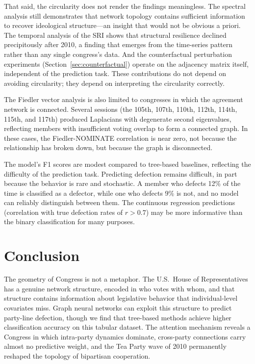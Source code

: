 \documentclass[11pt]{article}
\begin{document}
That said, the circularity does not render the findings meaningless. The spectral analysis still demonstrates that network topology contains sufficient information to recover ideological structure---an insight that would not be obvious a priori. The temporal analysis of the SRI shows that structural resilience declined precipitously after 2010, a finding that emerges from the time-series pattern rather than any single congress's data. And the counterfactual perturbation experiments (Section~\ref{sec:counterfactual}) operate on the adjacency matrix itself, independent of the prediction task. These contributions do not depend on avoiding circularity; they depend on interpreting the circularity correctly.

The Fiedler vector analysis is also limited to congresses in which the agreement network is connected. Several sessions (the 105th, 107th, 110th, 112th, 114th, 115th, and 117th) produced Laplacians with degenerate second eigenvalues, reflecting members with insufficient voting overlap to form a connected graph. In these cases, the Fiedler-NOMINATE correlation is near zero, not because the relationship has broken down, but because the graph is disconnected.

The model's F1 scores are modest compared to tree-based baselines, reflecting the difficulty of the prediction task. Predicting defection remains difficult, in part because the behavior is rare and stochastic. A member who defects 12\% of the time is classified as a defector, while one who defects 9\% is not, and no model can reliably distinguish between them. The continuous regression predictions (correlation with true defection rates of $r > 0.7$) may be more informative than the binary classification for many purposes.

\section{Conclusion}

The geometry of Congress is not a metaphor. The U.S.\ House of Representatives has a genuine network structure, encoded in who votes with whom, and that structure contains information about legislative behavior that individual-level covariates miss. Graph neural networks can exploit this structure to predict party-line defection, though we find that tree-based methods achieve higher classification accuracy on this tabular dataset. The attention mechanism reveals a Congress in which intra-party dynamics dominate, cross-party connections carry almost no predictive weight, and the Tea Party wave of 2010 permanently reshaped the topology of bipartisan cooperation.
\end{document}
